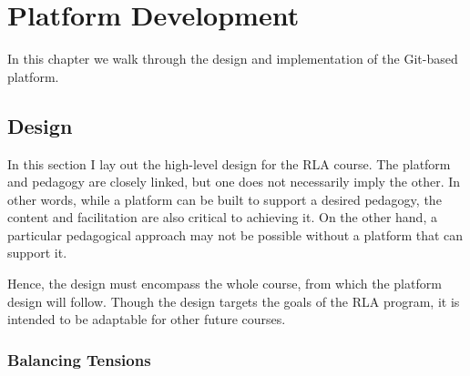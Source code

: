 \documentclass[12pt,twoside,vi]{mitthesis}
\begin{document}
\chapter{Platform Development}

In this chapter we walk through the design and implementation of the Git-based platform. 

\section{Design}

In this section I lay out the high-level design for the RLA course. The platform and pedagogy are closely linked, but one does not necessarily imply the other. In other words, while a platform can be built to support a desired pedagogy, the content and facilitation are also critical to achieving it. On the other hand, a particular pedagogical approach may not be possible without a platform that can support it. 

Hence, the design must encompass the whole course, from which the platform design will follow. Though the design targets the goals of the RLA program, it is intended to be adaptable for other future courses.

\subsection{Balancing Tensions}
\end{document}
